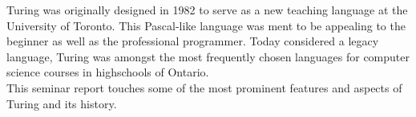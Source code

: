 Turing was originally designed in 1982 to serve as a new teaching language at the University of Toronto. This Pascal-like language was ment to be appealing to the beginner as well as the professional programmer. Today considered a legacy language, Turing was amongst the most frequently chosen languages for computer science courses in highschools of Ontario. \\
This seminar report touches some of the most prominent features and aspects of Turing and its history.